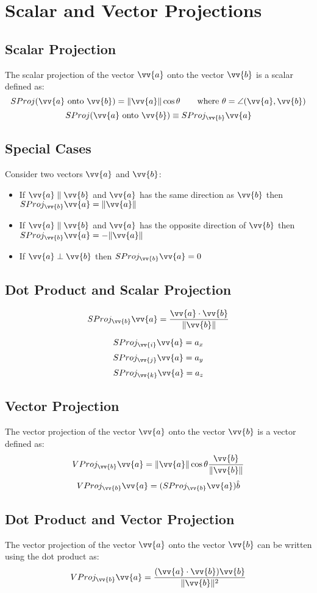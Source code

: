 	\section{Scalar and Vector Projections}
		\subsection{Scalar Projection}
			The scalar projection of the vector $\vv{a}$ onto the vector $\vv{b}$ is a scalar defined as:
			\[SProj(\vv{a} \text{ onto } \vv{b}) = \|\vv{a}\|\cos\theta \qquad \text{where } \theta = \angle(\vv{a}, \vv{b})\]
			\[SProj(\vv{a} \text{ onto } \vv{b}) \equiv SProj_{\vv{b}}\vv{a}\]
		\subsection{Special Cases}
			Consider two vectors $\vv{a}$ and $\vv{b}$:
			\begin{itemize}
				\item If $\vv{a} \parallel \vv{b}$ and $\vv{a}$ has the same direction as $\vv{b}$ then $SProj_{\vv{b}}\vv{a} = \|\vv{a}\|$
				\item If $\vv{a} \parallel \vv{b}$ and $\vv{a}$ has the opposite direction of $\vv{b}$ then $SProj_{\vv{b}}\vv{a} = -\|\vv{a}\|$
				\item If $\vv{a} \perp \vv{b}$ then $SProj_{\vv{b}}\vv{a}=0$
			\end{itemize}
		\subsection{Dot Product and Scalar Projection}
			\[SProj_{\vv{b}}\vv{a} = \frac{\vv{a} \cdot \vv{b}}{\|\vv{b}\|}\]

			\[SProj_{\vv{i}}\vv{a} = a_x\]
			\[SProj_{\vv{j}}\vv{a} = a_y\]
			\[SProj_{\vv{k}}\vv{a} = a_z\]
		\subsection{Vector Projection}
			The vector projection of the vector $\vv{a}$ onto the vector $\vv{b}$ is a vector defined as:
			\[VProj_{\vv{b}}\vv{a} = \|\vv{a}\|\cos\theta\frac{\vv{b}}{\|\vv{b}\|}\]
			\[VProj_{\vv{b}}\vv{a} = (SProj_{\vv{b}}\vv{a})\hat{b}\]
		\subsection{Dot Product and Vector Projection}
			The vector projection of the vector $\vv{a}$ onto the vector $\vv{b}$ can be written using the dot product as:
			\[VProj_{\vv{b}}\vv{a} = \frac{(\vv{a} \cdot \vv{b})\vv{b}}{\|\vv{b}\|^2}\]

